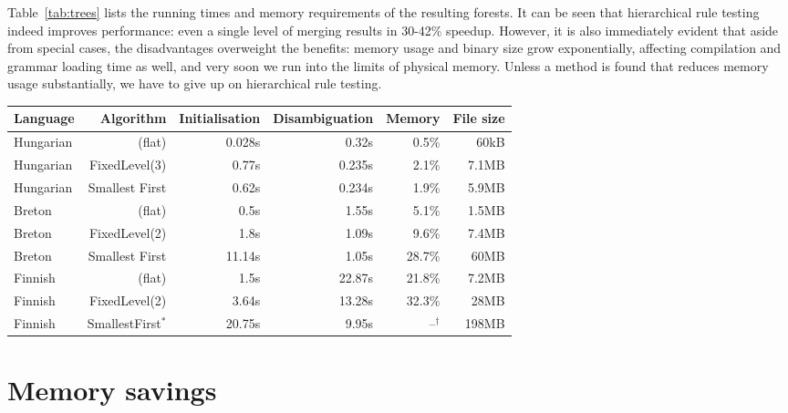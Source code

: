 \documentclass[11pt]{article}
\begin{document}
Table~\ref{tab:trees} lists the running times and memory requirements of the
resulting forests. It can be seen that hierarchical rule testing
indeed improves performance: even a single level of merging results in 30-42\%
speedup. However, it is also immediately evident that aside from special cases,
the disadvantages overweight the benefits: memory usage and binary size grow
exponentially, affecting compilation and grammar loading time as well, and very
soon we run into the limits of physical memory. Unless a method is found that
reduces memory usage substantially, we have to give up on hierarchical rule
testing.

\begin{table*}[h]
  \centering
  \caption{Performance and storage requirements of rule testing trees\\
           $^\ast$ State count limit was 500\hspace{3em}
           $^\dagger$ Reached limit of physical memory}
  \label{tab:trees}
  \begin{tabular}{ | l | r | r | r | r | r | }
  \hline
  \textbf{Language} & \textbf{Algorithm} & \textbf{Initialisation} &
  \textbf{Disambiguation} & \textbf{Memory} & \textbf{File size} \\
  \hline
  Hungarian & (flat) & 0.028s & 0.32s & 0.5\% & 60kB \\
  Hungarian & FixedLevel(3) & 0.77s & 0.235s & 2.1\% & 7.1MB \\
  Hungarian & Smallest First & 0.62s & 0.234s & 1.9\% & 5.9MB \\
\hline
  Breton    & (flat) & 0.5s & 1.55s & 5.1\% & 1.5MB \\
  Breton    & FixedLevel(2) & 1.8s & 1.09s & 9.6\% & 7.4MB \\
  Breton    & Smallest First & 11.14s & 1.05s & 28.7\% & 60MB \\
\hline
  Finnish   & (flat) & 1.5s & 22.87s & 21.8\% & 7.2MB \\
  Finnish   & FixedLevel(2) & 3.64s & 13.28s & 32.3\% & 28MB \\
  Finnish   & SmallestFirst$^\ast$ & 20.75s & 9.95s & --$^\dagger$ & 198MB \\
  \hline
  \end{tabular}
\end{table*}

\section{Memory savings}
\label{sec:memory}
\end{document}
